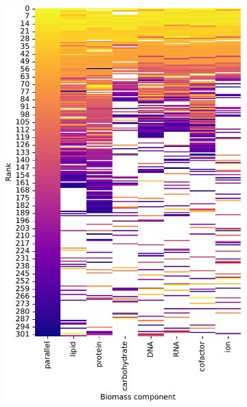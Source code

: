 \begin{figure}
  \centering
  \begin{subfigure}[t]{0.45\textwidth}
  \centering
    \includegraphics[width=\linewidth]{CompareEnzUse_glc01p69_pyrUnres_amm01p05_1.pdf}
    \caption{
    }
    \label{fig:model-rank-glc-highratio-rank}
  \end{subfigure}%
  \begin{subfigure}[t]{0.45\textwidth}
  \centering

\end{subfigure}
\end{figure}

